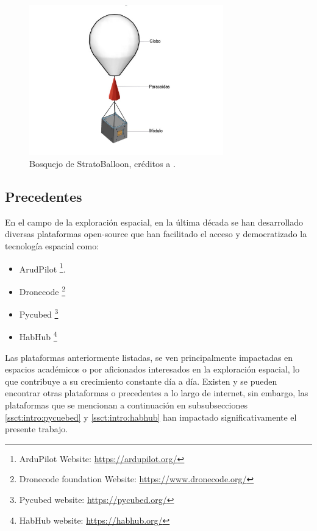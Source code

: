 \begin{figure} [!ht]
    \centering
    \includegraphics [width = 0.75\textwidth] {document/figures/01_componentes del globo}
    \caption{Bosquejo de StratoBalloon, créditos a \cite{tesis_estructura_stratoballoon}.}
    \label{fig:bosquejo_stratoballoon}
\end{figure}

\newpage

\subsection{Precedentes}

En el campo de la exploración espacial, en la última década se han desarrollado diversas plataformas open-source que han facilitado el  acceso y  democratizado la tecnología espacial como: 
 \begin{itemize}
     \item ArudPilot \footnote{ArduPilot Website: \url{https://ardupilot.org/}}.
     \item Dronecode \footnote{Dronecode foundation Website: \url{https://www.dronecode.org/}}
     \item Pycubed \footnote{Pycubed website: \url{https://pycubed.org/}}
     \item HabHub \footnote{HabHub website: \url{https://habhub.org/}}
 \end{itemize}

Las plataformas anteriormente listadas,  se ven principalmente impactadas en espacios académicos o por aficionados interesados en la exploración espacial, lo que contribuye a su crecimiento constante día a día. Existen y se pueden encontrar otras plataformas o precedentes a lo largo de internet, sin embargo, las plataformas que se mencionan a continuación  en subsubsecciones \ref{ssct:intro:pycuebed} y \ref{ssct:intro:habhub} han impactado significativamente el presente trabajo.

